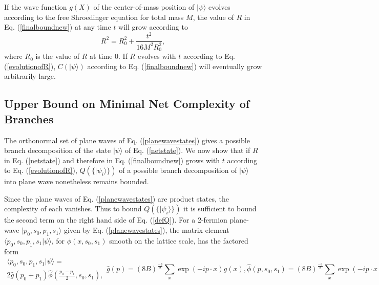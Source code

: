 \documentclass[12pt,amsmath,amssymb,onecolumn]{revtex4-2}
\begin{document}
If the wave function $g(X)$ of the center-of-mass position of 
$|\psi \rangle $ evolves according to the free Shroedinger equation for total mass $M$,
the value of $R$ in Eq. (\ref{finalboundnew}) at any time
$t$ will grow according to
\begin{equation}
\label{evolutionofR}
R^2 = R_0^2 + \frac{ t^2}{16 M^2 R_0^2},
\end{equation}
where $R_0$ is the value of $R$ at time 0.
If $R$ evolves with $t$  according to Eq. (\ref{evolutionofR}),
$C(|\psi \rangle )$ according to Eq. (\ref{finalboundnew}) will 
eventually grow arbitrarily large.

\subsection{\label{sec:upperboundnew} Upper Bound on Minimal Net Complexity of Branches}


The orthonormal set of plane waves of Eq. (\ref{planewavestates}) gives a
possible branch decomposition of the state $|\psi \rangle $ of Eq. (\ref{netstate}). 
We now show that if $R$ in Eq. (\ref{netstate}) and therefore in Eq. (\ref{finalboundnew})
grows with $t$ according to Eq. (\ref{evolutionofR}), $Q(\{|\psi_i \rangle \})$ of
a possible branch decomposition of $|\psi \rangle $ into plane wave nonetheless
remains bounded.

Since the plane waves of Eq. (\ref{planewavestates}) are product states, the
complexity of each vanishes. Thus to bound $Q(\{|\psi_i \rangle \})$ it is
sufficient to bound the second term on the right hand side of Eq. (\ref{defQ}).
For a 2-fermion plane-wave $|p_0, s_0, p_1, s_1 \rangle $ given by Eq. (\ref{planewavestates}),
the matrix element $ \langle p_0, s_0, p_1, s_1| \psi \rangle $, for $\phi( x, s_0, s_1)$ smooth on the
lattice scale,
has the factored form
\begin{subequations}
\begin{multline}
\label{psiplanewave}
 \langle p_0, s_0, p_1, s_1| \psi \rangle  = \\2 \hat{g}( p_0 + p_1) \hat{\phi}( \frac{p_0 - p_1}{2}, s_0, s_1),
\end{multline}
\begin{equation}
\label{ghat}
\hat{g}( p) = (8B)^{\frac{-3}{2}} \sum_x \exp( -ip \cdot x) g( x),
\end{equation}
\begin{equation}
\label{phihat}
\hat{\phi}(p, s_0, s_1) = (8B)^{\frac{-3}{2}} \sum_x \exp( -ip \cdot x) \phi( x, s_0, s_1).
\end{equation}
\end{subequations}
\end{document}
